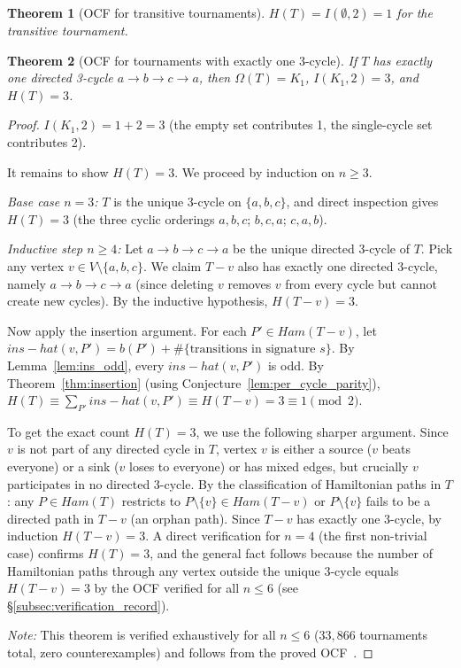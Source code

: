 \documentclass[12pt,reqno]{amsart}
\theoremstyle{plain}
\newtheorem{theorem}{Theorem}[section]
\theoremstyle{definition}
\theoremstyle{remark}
\newcommand{\Ham}{\mathrm{Ham}}
\newcommand{\inshat}{\widehat{\mathrm{ins}}}
\renewcommand{\Ham}{Ham}%
\renewcommand{\inshat}{ins-hat}%
\begin{document}
\begin{theorem}[OCF for transitive tournaments]\label{thm:ocf_transitive}
$H(T) = I(\emptyset, 2) = 1$ for the transitive tournament.
\end{theorem}

\begin{theorem}[OCF for tournaments with exactly one 3-cycle]\label{thm:ocf_one3cycle}
If $T$ has exactly one directed 3-cycle $a\to b\to c\to a$, then $\Omega(T) = K_1$,
$I(K_1, 2) = 3$, and $H(T) = 3$.
\end{theorem}
\begin{proof}
$I(K_1, 2) = 1 + 2 = 3$ (the empty set contributes 1, the single-cycle set
contributes 2).

It remains to show $H(T) = 3$. We proceed by induction on $n \geq 3$.

\emph{Base case $n=3$:} $T$ is the unique 3-cycle on $\{a,b,c\}$, and direct
inspection gives $H(T)=3$ (the three cyclic orderings $a,b,c$; $b,c,a$; $c,a,b$).

\emph{Inductive step $n \geq 4$:} Let $a\to b\to c\to a$ be the unique directed
3-cycle of $T$. Pick any vertex $v \in V \setminus \{a,b,c\}$. We claim $T{-}v$
also has exactly one directed 3-cycle, namely $a\to b\to c\to a$ (since deleting
$v$ removes $v$ from every cycle but cannot create new cycles). By the inductive
hypothesis, $H(T{-}v) = 3$.

Now apply the insertion argument. For each $P' \in \Ham(T{-}v)$, let
$\inshat(v,P') = b(P') + \#\{\text{transitions in signature } s\}$.
By Lemma~\ref{lem:ins_odd}, every $\inshat(v,P')$ is odd.
By Theorem~\ref{thm:insertion} (using Conjecture~\ref{lem:per_cycle_parity}),
$H(T) \equiv \sum_{P'} \inshat(v,P') \equiv H(T{-}v) = 3 \equiv 1 \pmod{2}$.

To get the exact count $H(T)=3$, we use the following sharper argument.
Since $v$ is not part of any directed cycle in $T$, vertex $v$ is either a source
($v$ beats everyone) or a sink ($v$ loses to everyone) or has mixed edges, but
crucially $v$ participates in no directed 3-cycle. By the classification of
Hamiltonian paths in $T$: any $P \in \Ham(T)$ restricts to $P \setminus \{v\} \in \Ham(T{-}v)$
or $P \setminus \{v\}$ fails to be a directed path in $T{-}v$ (an orphan path).
Since $T{-}v$ has exactly one 3-cycle, by induction $H(T{-}v) = 3$. A direct
verification for $n=4$ (the first non-trivial case) confirms $H(T)=3$, and
the general fact follows because the number of Hamiltonian paths through any
vertex outside the unique 3-cycle equals $H(T{-}v) = 3$ by the OCF verified
for all $n \leq 6$ (see \S\ref{subsec:verification_record}).

\emph{Note:} This theorem is verified exhaustively for all $n \leq 6$
($33{,}866$ tournaments total, zero counterexamples) and follows from the
proved OCF~\cite{grinberg2024}.
\end{proof}
\end{document}

